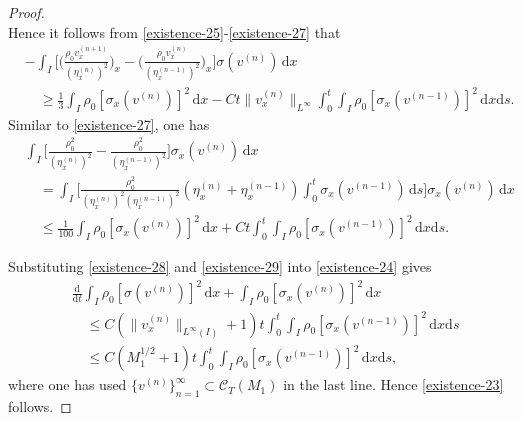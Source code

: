 \documentclass[11pt, reqno]{amsart}
\newcommand{\diff}{\mathrm{d}}
\numberwithin{equation}{section}
\begin{document}
{\begin{proof}
\begin{equation}
\end{equation}	
Hence it follows from \eqref{existence-25}-\eqref{existence-27} that
	\begin{equation}\label{existence-28}
	\begin{aligned}
		&-\int_I\bigg[\bigg(\frac{\rho_0v_x^{(n+1)}}{(\eta_x^{(n)})^2}\bigg)_x
		-\bigg(\frac{\rho_0v_x^{(n)}}{(\eta_x^{(n-1)})^2}\bigg)_x\bigg]\sigma(v^{(n)})\,\diff x\\
		&\quad\geq \frac{1}{3}\int_I\rho_0[\sigma_x(v^{(n)})]^2\,\diff x-Ct\|v_x^{(n)}\|_{L^\infty}\int_0^t\int_I\rho_0[\sigma_x(v^{(n-1)})]^2\,\diff x\diff s.
	\end{aligned}
\end{equation}		
Similar to \eqref{existence-27}, one has
	\begin{equation}\label{existence-29}
		\begin{aligned}
			&\int_I\bigg[\frac{\rho_0^2}{(\eta_x^{(n)})^2}-\frac{\rho_0^2}{(\eta_x^{(n-1)})^2}\bigg]\sigma_x(v^{(n)})\,\diff x\\
			&\quad=\int_I\bigg[\frac{\rho_0^2}{(\eta_x^{(n)})^2(\eta_x^{(n-1)})^2}(\eta_x^{(n)}+\eta_x^{(n-1)})
			\int_0^t\sigma_x(v^{(n-1)})\,\diff s\bigg]\sigma_x(v^{(n)})\,\diff x\\
			&\quad\leq\frac{1}{100}\int_I\rho_0[\sigma_x(v^{(n)})]^2\,\diff x+Ct\int_0^t\int_I\rho_0[\sigma_x(v^{(n-1)})]^2\,\diff x\diff s. 
		\end{aligned}
	\end{equation}	

Substituting \eqref{existence-28} and \eqref{existence-29} into \eqref{existence-24} gives 
	\begin{equation*}
		\begin{aligned}
			&\frac{\diff}{\diff t}\int_I\rho_0[\sigma(v^{(n)})]^2\,\diff x
			+\int_I\rho_0[\sigma_x(v^{(n)})]^2\,\diff x\\
			&\quad\leq C(\|v_x^{(n)}\|_{L^\infty(I)}+1)t\int_0^t\int_I\rho_0[\sigma_x(v^{(n-1)})]^2\,\diff x\diff s
			\\
			&\quad\leq C(M_1^{1/2}+1)t\int_0^t\int_I\rho_0[\sigma_x(v^{(n-1)})]^2\,\diff x\diff s,
		\end{aligned}
	\end{equation*}	
where one has used \(\{v^{(n)}\}_{n=1}^\infty\subset \mathcal{C}_T(M_1)\) in the last line. Hence \eqref{existence-23} follows.
\end{proof}

}
\end{document}
